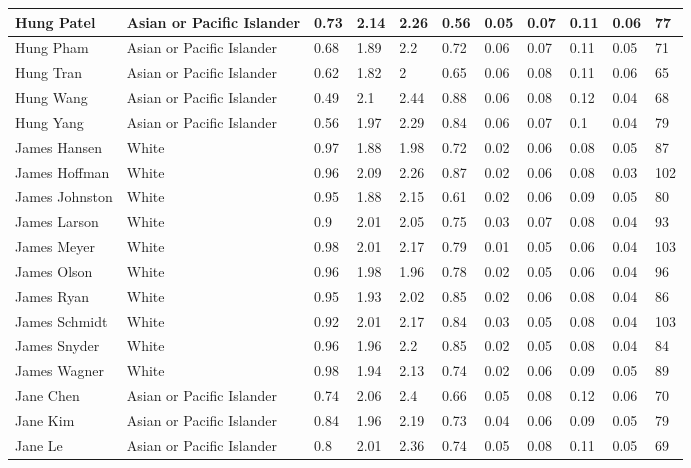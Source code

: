\begin{table}[!ht]
\begin{tabular}{|l|l|l|l|l|l|l|l|l|l|l|}
        Hung Patel & Asian or Pacific Islander & 0.73 & 2.14 & 2.26 & 0.56 & 0.05 & 0.07 & 0.11 & 0.06 & 77 \\ \hline
        Hung Pham & Asian or Pacific Islander & 0.68 & 1.89 & 2.2 & 0.72 & 0.06 & 0.07 & 0.11 & 0.05 & 71 \\ \hline
        Hung Tran & Asian or Pacific Islander & 0.62 & 1.82 & 2 & 0.65 & 0.06 & 0.08 & 0.11 & 0.06 & 65 \\ \hline
        Hung Wang & Asian or Pacific Islander & 0.49 & 2.1 & 2.44 & 0.88 & 0.06 & 0.08 & 0.12 & 0.04 & 68 \\ \hline
        Hung Yang & Asian or Pacific Islander & 0.56 & 1.97 & 2.29 & 0.84 & 0.06 & 0.07 & 0.1 & 0.04 & 79 \\ \hline
        James Hansen & White & 0.97 & 1.88 & 1.98 & 0.72 & 0.02 & 0.06 & 0.08 & 0.05 & 87 \\ \hline
        James Hoffman & White & 0.96 & 2.09 & 2.26 & 0.87 & 0.02 & 0.06 & 0.08 & 0.03 & 102 \\ \hline
        James Johnston & White & 0.95 & 1.88 & 2.15 & 0.61 & 0.02 & 0.06 & 0.09 & 0.05 & 80 \\ \hline
        James Larson & White & 0.9 & 2.01 & 2.05 & 0.75 & 0.03 & 0.07 & 0.08 & 0.04 & 93 \\ \hline
        James Meyer & White & 0.98 & 2.01 & 2.17 & 0.79 & 0.01 & 0.05 & 0.06 & 0.04 & 103 \\ \hline
        James Olson & White & 0.96 & 1.98 & 1.96 & 0.78 & 0.02 & 0.05 & 0.06 & 0.04 & 96 \\ \hline
        James Ryan & White & 0.95 & 1.93 & 2.02 & 0.85 & 0.02 & 0.06 & 0.08 & 0.04 & 86 \\ \hline
        James Schmidt & White & 0.92 & 2.01 & 2.17 & 0.84 & 0.03 & 0.05 & 0.08 & 0.04 & 103 \\ \hline
        James Snyder & White & 0.96 & 1.96 & 2.2 & 0.85 & 0.02 & 0.05 & 0.08 & 0.04 & 84 \\ \hline
        James Wagner & White & 0.98 & 1.94 & 2.13 & 0.74 & 0.02 & 0.06 & 0.09 & 0.05 & 89 \\ \hline
        Jane Chen & Asian or Pacific Islander & 0.74 & 2.06 & 2.4 & 0.66 & 0.05 & 0.08 & 0.12 & 0.06 & 70 \\ \hline
        Jane Kim & Asian or Pacific Islander & 0.84 & 1.96 & 2.19 & 0.73 & 0.04 & 0.06 & 0.09 & 0.05 & 79 \\ \hline
        Jane Le & Asian or Pacific Islander & 0.8 & 2.01 & 2.36 & 0.74 & 0.05 & 0.08 & 0.11 & 0.05 & 69 \\ \hline

\end{tabular}
\end{table}
